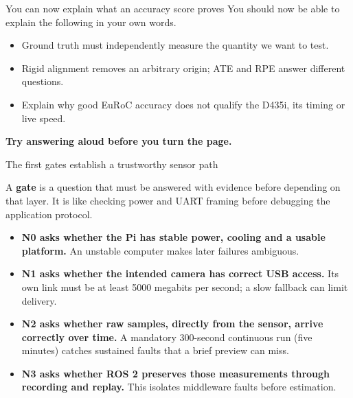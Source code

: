 \documentclass[aspectratio=169,12pt,t]{beamer}
\newcommand{\para}[1]{#1\par\medskip}
\newcommand{\lesson}[1]{\vfill{\color{teal!70!black}\bfseries #1}\par}
\begin{document}
\begin{frame}{You can now explain what an accuracy score proves}
\para{You should now be able to explain the following in your own words.}
\begin{itemize}
\item Ground truth must independently measure the quantity we want to test.
\item Rigid alignment removes an arbitrary origin; ATE and RPE answer different questions.
\item Explain why good EuRoC accuracy does not qualify the D435i, its timing or live speed.
\end{itemize}
\lesson{Try answering aloud before you turn the page.}
\end{frame}

\begin{frame}{The first gates establish a trustworthy sensor path}

\para{A \textbf{gate} is a question that must be answered with evidence before depending on that layer. It is like checking power and UART framing before debugging the application protocol.}
\begin{itemize}
\item \textbf{N0 asks whether the Pi has stable power, cooling and a usable platform.} An unstable computer makes later failures ambiguous.
\item \textbf{N1 asks whether the intended camera has correct USB access.} Its own link must be at least 5000 megabits per second; a slow fallback can limit delivery.
\item \textbf{N2 asks whether raw samples, directly from the sensor, arrive correctly over time.} A mandatory 300-second continuous run (five minutes) catches sustained faults that a brief preview can miss.
\item \textbf{N3 asks whether ROS 2 preserves those measurements through recording and replay.} This isolates middleware faults before estimation.
\end{itemize}

\end{frame}
\end{document}

